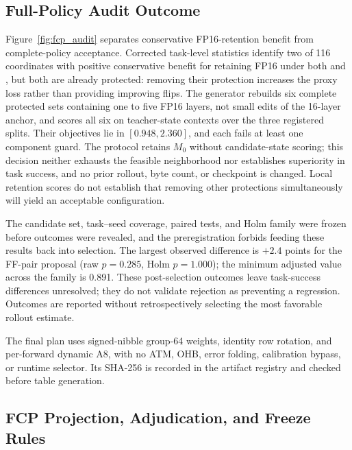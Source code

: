 \subsection{Full-Policy Audit Outcome}
\label{sec:fcp_visualization}





Figure~\ref{fig:fcp_audit} separates conservative FP16-retention benefit from complete-policy acceptance. Corrected task-level statistics identify two of 116 coordinates with positive conservative benefit for retaining FP16 under both \dfunc and \dpac, but both are already protected: removing their protection increases the proxy loss rather than providing improving flips. The generator rebuilds six complete protected sets containing one to five FP16 layers, not small edits of the 16-layer anchor, and scores all six on teacher-state contexts over the three registered splits. Their objectives lie in $[0.948,2.360]$, and each fails at least one component guard. The protocol retains $M_0$ without candidate-state scoring; this decision neither exhausts the feasible neighborhood nor establishes superiority in task success, and no prior rollout, byte count, or checkpoint is changed. Local retention scores do not establish that removing other protections simultaneously will yield an acceptable configuration.



The candidate set, task--seed coverage, paired tests, and Holm family were frozen before outcomes were revealed, and the preregistration forbids feeding these results back into selection. The largest observed difference is $+2.4$ points for the FF-pair proposal (raw $p=0.285$, Holm $p=1.000$); the minimum adjusted value across the family is 0.891. These post-selection outcomes leave task-success differences unresolved; they do not validate rejection as preventing a regression. Outcomes are reported without retrospectively selecting the most favorable rollout estimate.

The final plan uses signed-nibble group-64 weights, identity row rotation, and per-forward dynamic A8, with no ATM, OHB, error folding, calibration bypass, or runtime selector. Its SHA-256 is recorded in the artifact registry and checked before table generation.

\subsection{FCP Projection, Adjudication, and Freeze Rules}
\label{sec:fcp_rules}

